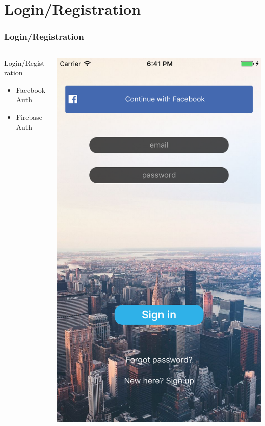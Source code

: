 \documentclass{beamer}
\begin{document}
\section{Login/Registration}
\begin{frame}
\frametitle{Login/Registration}
\begin{columns}
    \begin{column}{0.3\textwidth}
        Login/Registration
        \begin{itemize}
            \item Facebook Auth
            \item Firebase Auth
        \end{itemize}
    \end{column}
    \begin{column}{0.3\textwidth}  %
        \begin{center}
            \includegraphics[scale=0.3]{login}

\end{center}
\end{column}
\end{columns}
\end{frame}
\end{document}
